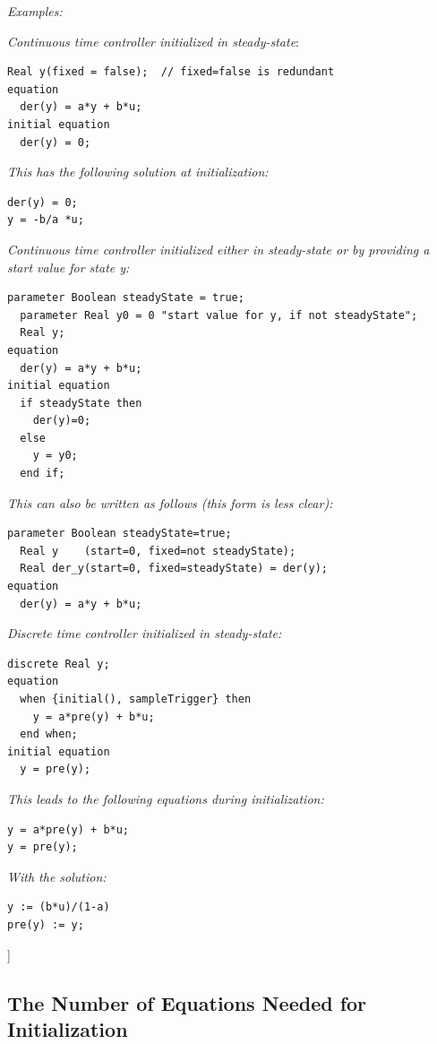\documentclass[10pt,a4paper]{report}
\def\doublelabel#1{\label{#1}\hypertarget{#1}{}}
\begin{document}
\emph{Examples:}

\emph{Continuous time controller initialized in steady-state}:
\begin{lstlisting}[language=modelica]
  Real y(fixed = false);  // fixed=false is redundant    
equation   
  der(y) = a*y + b*u; 
initial equation   
  der(y) = 0;
\end{lstlisting}

\emph{This has the following solution at initialization:}
\begin{lstlisting}[language=modelica]
der(y) = 0;
y = -b/a *u;
\end{lstlisting}

\emph{Continuous time controller initialized either in steady-state or
by providing a start value for state y:}
\begin{lstlisting}[language=modelica]
  parameter Boolean steadyState = true;
  parameter Real y0 = 0 "start value for y, if not steadyState";
  Real y;
equation
  der(y) = a*y + b*u;
initial equation
  if steadyState then
    der(y)=0;
  else
    y = y0;
  end if; 
\end{lstlisting}

\emph{This can also be written as follows (this form is less clear):}
\begin{lstlisting}[language=modelica]
  parameter Boolean steadyState=true;
  Real y    (start=0, fixed=not steadyState);
  Real der_y(start=0, fixed=steadyState) = der(y);
equation
  der(y) = a*y + b*u; 
\end{lstlisting}

\emph{Discrete time controller initialized in steady-state:}
\begin{lstlisting}[language=modelica]
  discrete Real y;
equation
  when {initial(), sampleTrigger} then
    y = a*pre(y) + b*u;
  end when;
initial equation
  y = pre(y);
\end{lstlisting}

\emph{This leads to the following equations during initialization:}
\begin{lstlisting}[language=modelica]
y = a*pre(y) + b*u;
y = pre(y);
\end{lstlisting}

\emph{With the solution:}
\begin{lstlisting}[language=modelica]
y := (b*u)/(1-a)
pre(y) := y;
\end{lstlisting}

{]}

\subsection{The Number of Equations Needed for Initialization}\doublelabel{the-number-of-equations-needed-for-initialization}
\end{document}
